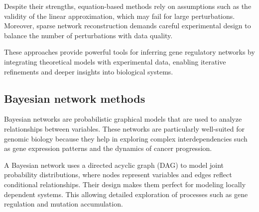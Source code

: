 Despite their strengths, equation-based methods rely on assumptions such as the validity of the linear approximation, which may fail for large perturbations.
Moreover, sparse network reconstruction demands careful experimental design to balance the number of perturbations with data quality\supercite{yeung_reverse_2002}.


\noindent These approaches provide powerful tools for inferring gene regulatory networks by integrating theoretical models with experimental data, enabling iterative refinements and deeper insights into biological systems.


\subsection{Bayesian network methods}\label{subsec:bayesian-network-methods}

Bayesian networks are probabilistic graphical models that are used to analyze relationships between variables.
These networks are particularly well-suited for genomic biology because they help in exploring complex interdependencies such as gene expression patterns and the dynamics of cancer progression\supercite{friedman_using_2000, gerstung_quantifying_2009}.

A Bayesian network uses a directed acyclic graph (DAG) to model joint probability distributions, where nodes represent variables and edges reflect conditional relationships.
Their design makes them perfect for modeling locally dependent systems.
This allowing detailed exploration of processes such as gene regulation and mutation accumulation\supercite{friedman_using_2000}.

